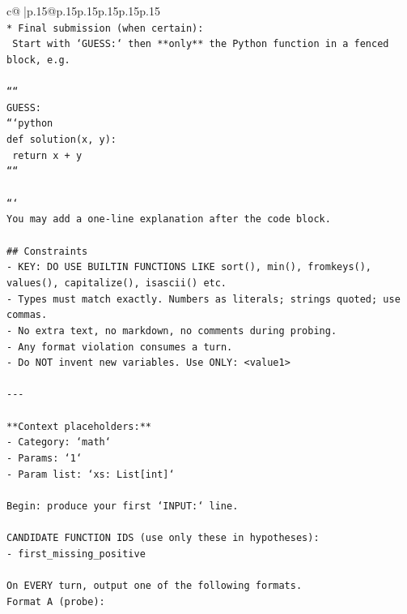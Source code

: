 \documentclass{article}
\begin{document}
{\begin{supertabular}{c@{$\;$}|p{.15\linewidth}@{}p{.15\linewidth}p{.15\linewidth}p{.15\linewidth}p{.15\linewidth}p{.15\linewidth}}
{{{\\ 
\texttt{* Final submission (when certain):} \\
\texttt{  Start with `GUESS:` then **only** the Python function in a fenced block, e.g.} \\
\\ 
\texttt{````} \\
\texttt{GUESS:} \\
\texttt{```python} \\
\texttt{def solution(x, y):} \\
\texttt{    return x + y} \\
\texttt{````} \\
\\ 
\texttt{```} \\
\texttt{You may add a one{-}line explanation after the code block.} \\
\\ 
\texttt{\#\# Constraints} \\
\texttt{{-} KEY: DO USE BUILTIN FUNCTIONS LIKE sort(), min(), fromkeys(), values(), capitalize(), isascii() etc.} \\
\texttt{{-} Types must match exactly. Numbers as literals; strings quoted; use commas.} \\
\texttt{{-} No extra text, no markdown, no comments during probing.} \\
\texttt{{-} Any format violation consumes a turn.} \\
\texttt{{-} Do NOT invent new variables. Use ONLY: <value1>} \\
\\ 
\texttt{{-}{-}{-}} \\
\\ 
\texttt{**Context placeholders:**} \\
\texttt{{-} Category: `math`} \\
\texttt{{-} Params: `1`} \\
\texttt{{-} Param list: `xs: List{[}int{]}`} \\
\\ 
\texttt{Begin: produce your first `INPUT:` line.} \\
\\ 
\texttt{CANDIDATE FUNCTION IDS (use only these in hypotheses):} \\
\texttt{{-} first\_missing\_positive} \\
\\ 
\texttt{On EVERY turn, output one of the following formats.} \\
\texttt{Format A (probe):} \\
}}}
\end{supertabular}}
\end{document}
